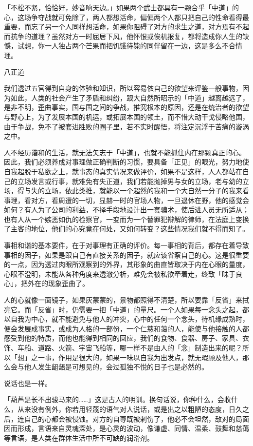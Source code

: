 \documentclass[12pt,twoside,openany]{book}
\begin{document}
「不松不紧，恰恰好，妙音响天边。」如果两个武士都具有一颗合乎「中道」的心，这场争夺战就可免除了，两人都想活命，偏偏两个人都只把自己的性命看得最重要，而忘了另一个人同样想活命，如果你阻碍了对方的求生之道，对方焉有不起而抗争的道理？虽然对方一时屈居下风，他怀恨或俟机报复，都将造成你人生的缺憾，试想，你一人独占两个芒果而把饥饿待毙的同伴留在一边，这是多么不合情理。

八正道

我们透过五官得到自身的体验和知识，所以容易依自己的欲望来评鉴一般事物，因为如此，人类的社会产生了矛盾和纠纷，跟大自然所昭示的「中道」越离越远了，是非不明，歪曲事实，国与国之间的争战，推究根本的原因，还是在统治者的欲望与野心上，为了发展本国的机运，或拓展本国的领土，而不惜大动干戈侵略他国，由于争战，免不了被套进胜败的圈子里，若不实时醒悟，将注定沉浮于苦痛的漩涡之中。

人不经历谐和的生活，就无法矢志于「中道」，也就不能抓住内在那颗真正的心。因此，我们必须养成对事理做正确判断的习惯，要具备「正见」的眼光，努力地使自我超脱于私欲之上，就事态的真实情况来做评价，如果不是这样，人人都站在自己的立场发言或行事，就难免有失正道，我们若能抛掉男与女的立场，老与幼的立场，得与失的立场，依此类推，就能以一个超然的我和一个大自然一分子的我来看事理，看对方，看周遭的一切，显赫一时的官场人物，一旦退休在野，他的感觉会如何？有人为了公司的利益，不择手段地设计出一套骗术，使后进人员无所适从；也有人从一个嫉恶如仇的检察官，一变而为一个替罪犯辩解的律师，在法庭上变换了主客的地位，他们的心究竟在何处，又如何转变？这些情况我们就不得而知了。

事相和谐的基本要件，在于对事理有正确的评价。每一事相的背后，都存在着导致事相的因子，如果是跟自己有直接关系的因子，就应该省察自己的心。这是很重要的一点，因为透过肉眼所观察到的外界，其形象的曲直皆取决于内在心眼的量度，心眼不澄明，未能从各种角度来透澈分析，难免会被私欲牵着走，终致「昧于良心」，把外在的现象歪曲了。

人的心就像一面镜子，如果灰蒙蒙的，景物都照得不清楚，所以要靠「反省」来拭亮它。而「反省」时，仍需要一把「中道」的量尺。一个人如果每一念头之起，都以自我为中心，就不能避免与他人的冲突，心中的任何一个念头，待机缘成熟时，便会发展成事实，或成为人格的一部份，一个仁慈和蔼的人，能使与他接触的人都感受到他的特质，而他也能得到相同的回应，我们的食物、食器、房子、家具、衣饰、车船、道路、火箭、宇宙飞船等，哪一样不是由人的「念」制造出来的呢？所以「想」之一事，作用是很大的，如果一味以自我为出发点，就无暇顾及他人，那么会与他人发生龃龉是可想见的，会过孤独不悦的日子也是必然的。

说话也是一样。

「葫芦是长不出骏马来的……」这是古人的明训。换句话说，你种什么，会收什么，从来没有例外，你若用轻蔑的语气对人说话，或是出之以粗陋的态度，日久之后，连自己的心都会被侵蚀。对方的自尊既被剌伤了，他必不会坦然，敌对的局面因而形成，言语来自灵魂深处，是心灵的波动，像谦虚、同情、温柔、鼓舞和慈蔼等言语，是人类在群体生活中所不可缺的润滑剂。
\end{document}
